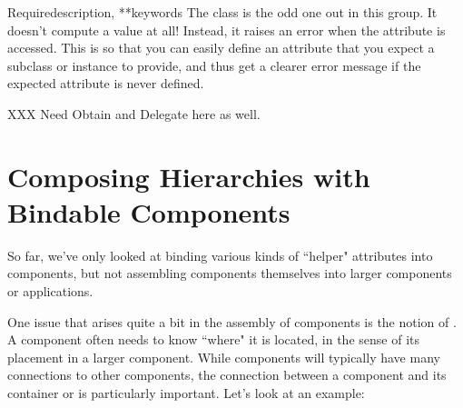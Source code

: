 \begin{verbatim%
}
\begin{verbatim%
}
\begin{verbatim%
}
\begin{verbatim%
}
\begin{verbatim%
}
\begin{verbatim%
}
\begin{verbatim%
}
\begin{verbatim%
}
\begin{verbatim%
}
\begin{funcdesc}{Require}{description, **keywords}
The  class is the odd one out in this group.
It doesn't compute a value at all!  Instead, it raises an error when the
attribute is accessed.  This is so that you can easily define an attribute that
you expect a subclass or instance to provide, and thus get a clearer error
message if the expected attribute is never defined.
\end{funcdesc}

XXX Need Obtain and Delegate here as well.
\newpage







\section{Composing Hierarchies with Bindable Components}

So far, we've only looked at binding various kinds of ``helper" attributes
into components, but not assembling components themselves into larger
components or applications.

One issue that arises quite a bit in the assembly of components is the notion
of .  A component often needs to know ``where" it is located,
in the sense of its placement in a larger component.  While components will
typically have many connections to other components, the connection between
a component and its container or  is particularly
important.  Let's look at an example:

\end{verbatim%
}
\end{verbatim%
}
\end{verbatim%
}
\end{verbatim%
}
\end{verbatim%
}
\end{verbatim%
}
\end{verbatim%
}
\end{verbatim%
}
\end{verbatim%
}
